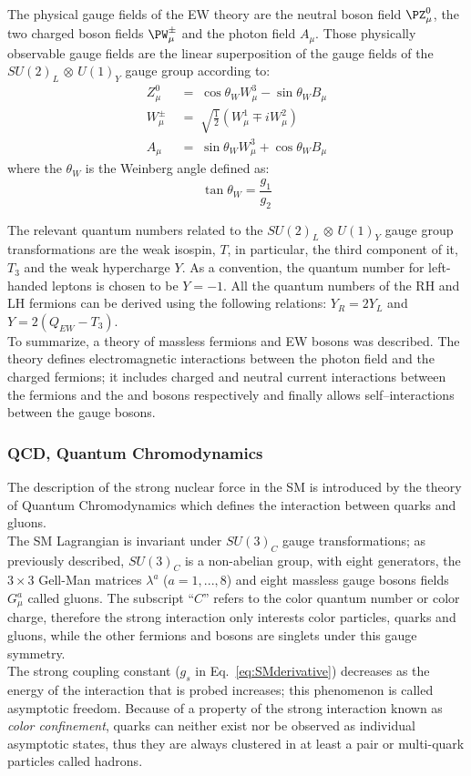 The physical gauge fields of the EW  theory are the neutral \PZ boson field $\PZ^0_{\mu}$, the two charged \PW boson fields $\PW^{\pm}_{\mu}$ and the photon field $A_{\mu}$. Those physically observable gauge fields are the linear superposition of the gauge fields of the $SU(2)_{L}$ $\otimes$ $U(1)_{Y}$ gauge group according to:
\begin{align}
Z^0_{\mu} \; &= \; \cos\theta_{W} W^3_{\mu} - \sin\theta_{W} B_{\mu} \label{eq:z}\\
W^{\pm}_{\mu} \; &= \; \sqrt{\frac{1}{2}}(W^1_{\mu} \mp iW^2_{\mu}) \label{eq:w}\\
A_{\mu} \; &= \; \sin\theta_{W} W^3_{\mu} + \cos\theta_{W} B_{\mu} \label{eq:photon}
\end{align}
where the $\theta_W$ is the Weinberg angle defined as:
\begin{equation}
\label{eq:weinberg}
\tan \theta_W = \frac{g_1}{g_2}
\end{equation}

The relevant quantum numbers related to the $SU(2)_{L}$ $\otimes$ $U(1)_{Y}$ gauge group transformations are the weak isospin, $T$, in particular, the third component of it, $T_3$ and the weak hypercharge $Y$. As a convention, the quantum number for left-handed leptons is chosen to be $Y = -1$. All the quantum numbers of the RH and LH fermions can be derived using the following relations: $Y_R = 2Y_L$ and $Y = 2(Q_{EW}-T_3)$.\\

To summarize, a theory of massless fermions and EW bosons was described. The theory defines electromagnetic interactions between the photon field and the charged fermions; it includes charged and neutral current interactions between the fermions and the \PW and \PZ bosons respectively and finally allows self–interactions between the gauge bosons. 

\subsubsection{QCD, Quantum Chromodynamics}\label{sec:qcd}
The description of the strong nuclear force in the SM is introduced by the theory of Quantum Chromodynamics which defines the interaction between quarks and gluons.\\
The SM Lagrangian is invariant under $SU(3)_C$ gauge transformations; as previously described, $SU(3)_C$ is a non-abelian group, with eight generators, the $3\times3$ Gell-Man matrices $\lambda^a$ ($a = 1,...,8$) and eight massless gauge bosons fields $G^a_{\mu}$ called gluons. The subscript ``$C$'' refers to the color quantum number or color charge, therefore the strong interaction only interests color particles, quarks and gluons, while the other fermions and bosons are singlets under this gauge symmetry. \\ 
The strong coupling constant ($g_s$ in Eq.~\ref{eq:SMderivative}) decreases as the energy of the interaction that is probed increases; this phenomenon is called asymptotic freedom.
Because of a property of the strong interaction known as \emph{color confinement}, quarks can neither exist nor be observed as individual asymptotic states, thus they are always clustered in at least a pair or multi-quark particles called hadrons.


